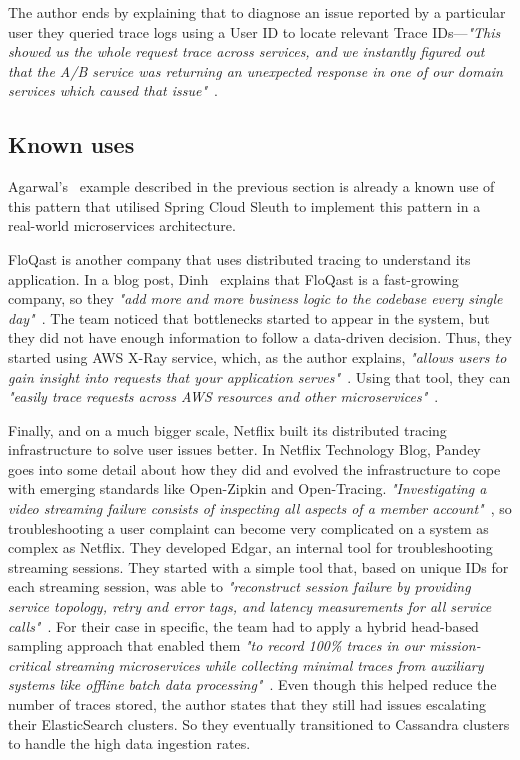 \documentclass[runningheads]{llncs}
\begin{document}
The author ends by explaining that to diagnose an issue reported by a particular user they queried trace logs using a User ID to locate relevant Trace IDs---\textit{"This showed us the whole request trace across services, and we instantly figured out that the A/B service was returning an unexpected response in one of our domain services which caused that issue"}~\cite{Agarwal-2022}.

\subsection{Known uses}
Agarwal's~\cite{Agarwal-2022} example described in the previous section is already a known use of this pattern that utilised Spring Cloud Sleuth to implement this pattern in a real-world microservices architecture.

FloQast is another company that uses distributed tracing to understand its application. In a blog post, Dinh~\cite{Dinh-2020} explains that FloQast is a fast-growing company, so they \textit{"add more and more business logic to the codebase every single day"}~\cite{Dinh-2020}. The team noticed that bottlenecks started to appear in the system, but they did not have enough information to follow a data-driven decision. Thus, they started using AWS X-Ray service, which, as the author explains, \textit{"allows users to gain insight into requests that your application serves"}~\cite{Dinh-2020}. Using that tool, they can \textit{"easily trace requests across AWS resources and other microservices"}~\cite{Dinh-2020}.

Finally, and on a much bigger scale, Netflix built its distributed tracing infrastructure to solve user issues better. In Netflix Technology Blog, Pandey~\cite{Pandey-Netflix-2020} goes into some detail about how they did and evolved the infrastructure to cope with emerging standards like Open-Zipkin and Open-Tracing. \textit{"Investigating a video streaming failure consists of inspecting all aspects of a member account"}~\cite{Pandey-Netflix-2020}, so troubleshooting a user complaint can become very complicated on a system as complex as Netflix. They developed Edgar, an internal tool for troubleshooting streaming sessions. They started with a simple tool that, based on unique IDs for each streaming session, was able to \textit{"reconstruct session failure by providing service topology, retry and error tags, and latency measurements for all service calls"}~\cite{Pandey-Netflix-2020}. For their case in specific, the team had to apply a hybrid head-based sampling approach that enabled them \textit{"to record 100\% traces in our mission-critical streaming microservices while collecting minimal traces from auxiliary systems like offline batch data processing"}~\cite{Pandey-Netflix-2020}. Even though this helped reduce the number of traces stored, the author states that they still had issues escalating their ElasticSearch clusters. So they eventually transitioned to Cassandra clusters to handle the high data ingestion rates.
\end{document}
